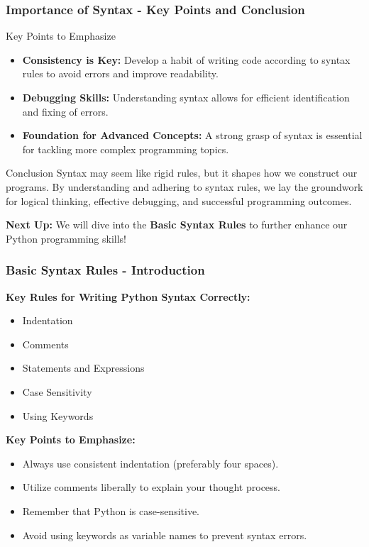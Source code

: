 \documentclass{beamer}
\begin{document}
\begin{frame}[fragile]
    \frametitle{Importance of Syntax - Key Points and Conclusion}
    \begin{block}{Key Points to Emphasize}
        \begin{itemize}
            \item \textbf{Consistency is Key:} Develop a habit of writing code according to syntax rules to avoid errors and improve readability.
            \item \textbf{Debugging Skills:} Understanding syntax allows for efficient identification and fixing of errors.
            \item \textbf{Foundation for Advanced Concepts:} A strong grasp of syntax is essential for tackling more complex programming topics.
        \end{itemize}
    \end{block}

    \begin{block}{Conclusion}
        Syntax may seem like rigid rules, but it shapes how we construct our programs. 
        By understanding and adhering to syntax rules, we lay the groundwork for logical thinking, effective debugging, and successful programming outcomes.
    \end{block}

    \textbf{Next Up:} We will dive into the \textbf{Basic Syntax Rules} to further enhance our Python programming skills!
\end{frame}

\begin{frame}[fragile]
    \frametitle{Basic Syntax Rules - Introduction}
    \textbf{Key Rules for Writing Python Syntax Correctly:}
    \begin{itemize}
        \item Indentation
        \item Comments
        \item Statements and Expressions
        \item Case Sensitivity
        \item Using Keywords
    \end{itemize}
    \vspace{10pt}
    \textbf{Key Points to Emphasize:}
    \begin{itemize}
        \item Always use consistent indentation (preferably four spaces).
        \item Utilize comments liberally to explain your thought process.
        \item Remember that Python is case-sensitive.
        \item Avoid using keywords as variable names to prevent syntax errors.
    \end{itemize}
\end{frame}
\end{document}
